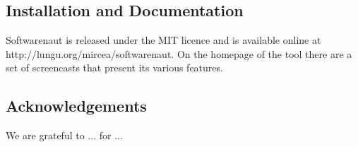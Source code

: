 \documentclass[preprint,12pt]{elsarticle}
\begin{document}
\subsection* {Installation and Documentation}
Softwarenaut is released under the MIT licence and is available online at http://lungu.org/mircea/softwarenaut. On the homepage of the tool there are a set of screencasts that present its various features. 

\subsection* {Acknowledgements} We are grateful to ... for ...


\newpage













\end{document}
